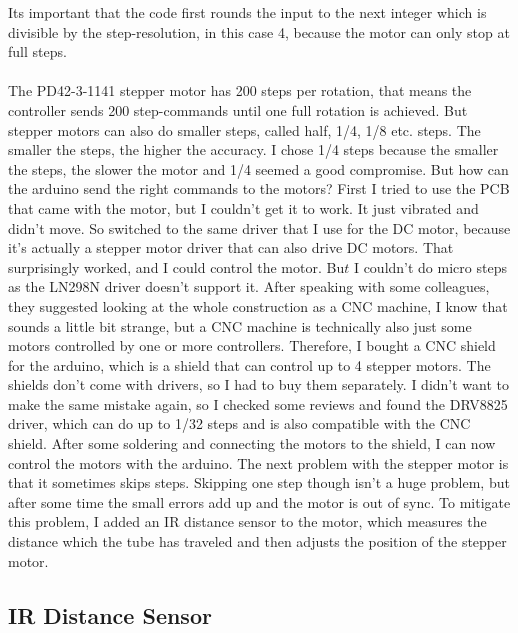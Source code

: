 Its important that the code first rounds the input to the next integer which is divisible by the step-resolution, in this case 4, because the motor can only stop at full steps.\\
\vspace{0.5cm}\\
The PD42-3-1141 stepper motor has 200 steps per rotation, that means the controller sends 200 step-commands until one full rotation is achieved.
But stepper motors can also do smaller steps, called half, 1/4, 1/8 etc. steps.
The smaller the steps, the higher the accuracy.
I chose 1/4 steps because the smaller the steps, the slower the motor and 1/4 seemed a good compromise.
But how can the arduino send the right commands to the motors?
First I tried to use the PCB that came with the motor, but I couldn't get it to work.
It just vibrated and didn't move.
So switched to the same driver that I use for the DC motor, because it's actually a stepper motor driver that can also drive DC motors.
That surprisingly worked, and I could control the motor.
Bu\(t\) I couldn't do micro steps as the LN298N driver doesn't support it.
After speaking with some colleagues, they suggested looking at the whole construction as a CNC machine, I know that sounds a little bit strange, but a CNC machine is technically also just some motors controlled by one or more controllers.
Therefore, I bought a CNC shield for the arduino, which is a shield that can control up to 4 stepper motors.
The shields don't come with drivers, so I had to buy them separately.
I didn't want to make the same mistake again, so I checked some reviews and found the DRV8825\autocite{drv8825} driver, which can do up to 1/32 steps and is also compatible with the CNC shield.
After some soldering and connecting the motors to the shield, I can now control the motors with the arduino.
The next problem with the stepper motor is that it sometimes skips steps.
Skipping one step though isn't a huge problem, but after some time the small errors add up and the motor is out of sync.
To mitigate this problem, I added an IR distance sensor to the motor, which measures the distance which the tube has traveled and then adjusts the position of the stepper motor.

\subsection{IR Distance Sensor}\label{subsec:ir-distance-sensor}

